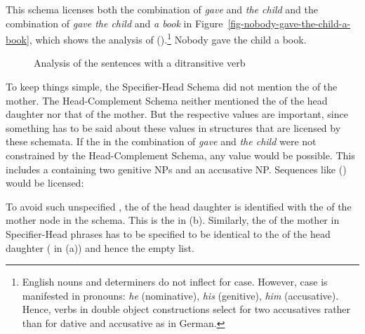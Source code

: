 This schema licenses both the combination of \emph{gave} and \emph{the child} and the combination of
\emph{gave the child} and \emph{a book} in Figure~\vref{fig-nobody-gave-the-child-a-book}, which shows the
analysis of ().\footnote{%
  English nouns and determiners do not inflect for case. However, case is manifested in pronouns:
  \emph{he} (nominative), \emph{his} (genitive), \emph{him} (accusative). Hence, verbs in double object
  constructions select for two accusatives rather than for dative and accusative as in German. 
}
\ea
\label{ex-nobody-gave-the-child-a-book}
Nobody gave the child a book.
\z
\begin{figure}
\caption{\label{fig-nobody-gave-the-child-a-book}Analysis of the sentences with a ditransitive verb}
\end{figure}

To keep things simple, the Specifier-Head Schema did not mention the \compsv of the mother. The
Head-Complement Schema neither mentioned the \sprv of the head daughter nor that of the mother. But the
respective values are important, since something has to be said about these values in structures
that are licensed by these schemata. If the \sprv in the combination of \emph{gave} and \emph{the
  child} were not constrained by the Head-Complement Schema, any value would be possible. This
includes a \sprl containing two genitive NPs and an accusative NP. Sequences like () would be
licensed:

\z
To avoid such unspecified \sprvs, the \sprv of the head daughter is identified with the \sprv of the
mother node in the schema. This is the  in (b). Similarly, the \compsv of the mother
in Specifier-Head phrases has to be specified to be identical to the \compsv of the head daughter
( in (a)) and hence the empty list.

